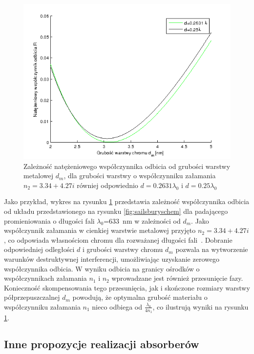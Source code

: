 \begin{figure}[htb]
	\centering
	\includegraphics[width=\textwidth]{images/pml/sailsbury-res.png}
	\caption{Zależność natężeniowego współczynnika odbicia od grubości warstwy metalowej $d_m$, dla grubości warstwy o współczynniku załamania $n_2=3.34 + 4.27i$ równiej odpowiednio $d=0.2631\lambda_0$ i $d=0.25\lambda_0$}
	\label{fig:sailsburyres}
\end{figure}

Jako przykład,  wykres na rysunku \ref{fig:sailsburyres}  przedstawia zależność współczynnika odbicia od układu przedstawionego na rysunku \ref{fig:sailsburyschem} dla padającego promieniowania o długości fali $\lambda_0$=633~nm w zależności od $d_m$. Jako współczynnik załamania w cienkiej warstwie metalowej przyjęto $n_2=3.34+4.27i$, co odpowiada własnościom chromu dla rozważanej długości fali~\cite{ordal1983optical}. Dobranie odpowiedniej odległości $d$ i grubości warstwy chromu $d_m$ pozwala na wytworzenie warunków destruktywnej interferencji, umożliwiając uzyskanie zerowego współczynnika odbicia. W wyniku odbicia na granicy ośrodków o współczynnikach załamania $n_1$ i $n_2$ wprowadzane jest również przesunięcie fazy. Konieczność skompensowania tego przesunięcia, jak i skończone rozmiary warstwy półprzepuszczalnej $d_m$ powodują, że optymalna grubość materiału o współczynniku załamania $n_1$ nieco odbiega od $\frac{\lambda_0}{4 n_1}$, co ilustrują wyniki na rysunku \ref{fig:sailsburyres}. 

\subsection{Inne propozycje realizacji absorberów}

